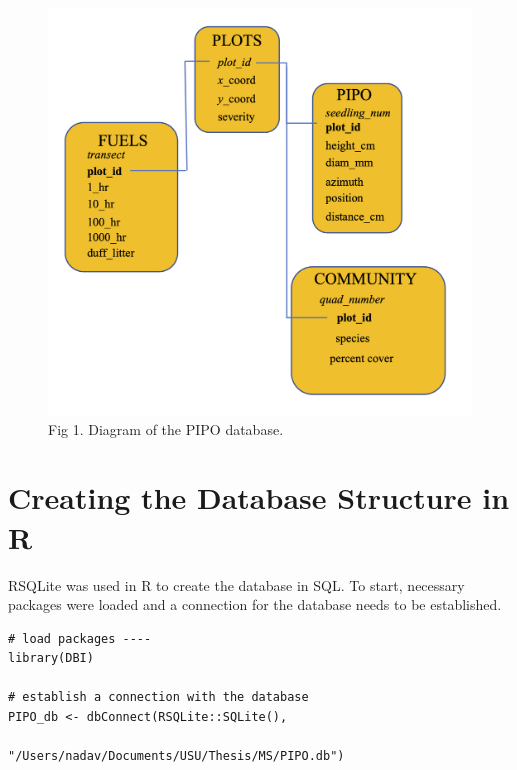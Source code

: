 \documentclass[
]{book}
\begin{document}
\begin{figure}
\centering
\includegraphics{database_structure_update.png}
\caption{Fig 1. Diagram of the PIPO database.}
\end{figure}

\hypertarget{creating-the-database-structure-in-r}{%
\section{Creating the Database Structure in R}\label{creating-the-database-structure-in-r}}

RSQLite was used in R to create the database in SQL. To start, necessary packages were loaded
and a connection for the database needs to be established.

\begin{verbatim}
# load packages ----
library(DBI)

# establish a connection with the database
PIPO_db <- dbConnect(RSQLite::SQLite(),
                        "/Users/nadav/Documents/USU/Thesis/MS/PIPO.db")
\end{verbatim}

  
\end{document}
